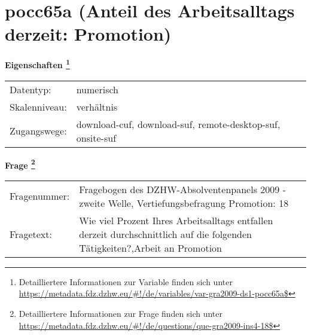 
    \setcounter{footnote}{0}

    \vspace*{-1.8cm}
	\section{pocc65a (Anteil des Arbeitsalltags derzeit: Promotion)}
	\label{section:pocc65a}



    \vspace*{0.5cm}
    \noindent\textbf{Eigenschaften
	\footnote{Detailliertere Informationen zur Variable finden sich unter
		\url{https://metadata.fdz.dzhw.eu/\#!/de/variables/var-gra2009-ds1-pocc65a$}}}\\
	\begin{tabularx}{\hsize}{@{}lX}
	Datentyp: & numerisch \\
	Skalenniveau: & verhältnis \\
	Zugangswege: &
	  download-cuf, 
	  download-suf, 
	  remote-desktop-suf, 
	  onsite-suf
 \\
    \end{tabularx}



				\vspace*{0.5cm}
                \noindent\textbf{Frage
	                \footnote{Detailliertere Informationen zur Frage finden sich unter
		              \url{https://metadata.fdz.dzhw.eu/\#!/de/questions/que-gra2009-ins4-18$}}}\\
				\begin{tabularx}{\hsize}{@{}lX}
					Fragenummer: &
					  Fragebogen des DZHW-Absolventenpanels 2009 - zweite Welle, Vertiefungsbefragung Promotion:
					  18
 \\
					Fragetext: & Wie viel Prozent Ihres Arbeitsalltags entfallen derzeit durchschnittlich auf die folgenden Tätigkeiten?,Arbeit an Promotion \\
				\end{tabularx}





